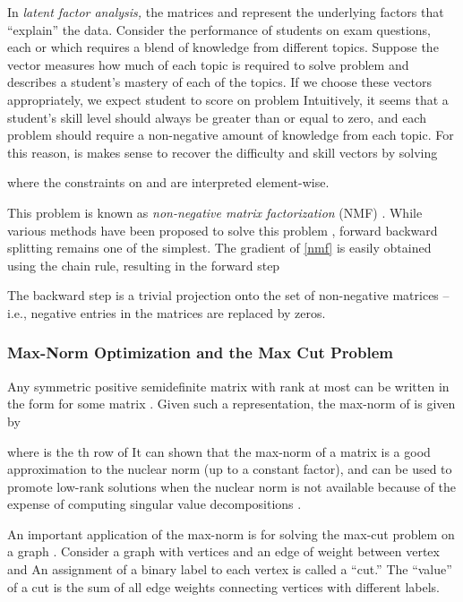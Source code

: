 \documentclass{amsart}
\newcommand{\aln}[1]{}
\newcommand{\st}{\hbox{ \,\,subject to\,\, }}
\DeclareMathOperator*{\minimize}{minimize\quad}
\theoremstyle{definition}
\begin{document}
  In {\em latent factor analysis,} the matrices  and  represent the underlying factors that ``explain'' the data.  Consider the performance of students on exam questions, each or which requires a blend of knowledge from  different topics.  Suppose the vector  measures how much of each topic is required to solve problem  and   describes a student's mastery of each of the  topics.  If we choose these vectors appropriately, we expect student  to score  on problem    Intuitively, it seems that a student's skill level should always be greater than or equal to zero, and each problem should require a non-negative amount of knowledge from each topic.  For this reason, is makes sense to recover the difficulty and skill vectors by solving
   \aln{\minimize_{W,C} &\|  Q-WC^T  \|^2  \label{nmf}\\
   \st & W\ge 0, C \ge 0 \nonumber
   }
   where the constraints on  and  are interpreted element-wise.
   
   This problem is known as {\em non-negative matrix factorization} (NMF) \cite{LS99}.  While various methods have been proposed to solve this problem \cite{LMACD14, LS00}, forward backward splitting remains one of the simplest.  The gradient of \eqref{nmf} is easily obtained using the chain rule, resulting in the forward step 
      
The backward step is a trivial projection onto the set of non-negative matrices -- i.e., negative entries in the matrices are replaced by zeros.
  
  
\subsubsection{Max-Norm Optimization and the Max Cut Problem}
Any  symmetric positive semidefinite matrix  with rank at most  can be written in the form  for some matrix .  Given such a representation, the max-norm of  is given by 
        
    where  is the th row of   It can shown that the max-norm of a matrix is a good approximation to the nuclear norm (up to a constant factor), and can be used to promote low-rank solutions when the nuclear norm is not available because of the expense of computing singular value decompositions \cite{LRSST10}. 
	
An important application of the max-norm is for solving the max-cut problem on a graph \cite{LRSST10}. Consider a graph with  vertices and an edge of weight  between vertex  and   An  assignment of a binary label  to each vertex is called a ``cut.''  The ``value'' of a cut is the sum of all edge weights connecting vertices with different labels.
\end{document}
